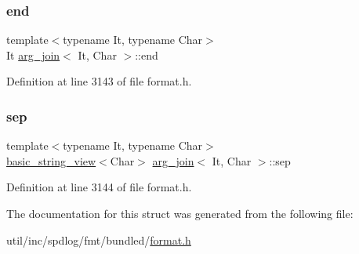 \subsubsection{\texorpdfstring{end}{end}}
{\footnotesize\ttfamily template$<$typename It, typename Char$>$ \\
It \hyperlink{structarg__join}{arg\+\_\+join}$<$ It, Char $>$\+::end}



Definition at line 3143 of file format.\+h.

\mbox{\label{structarg__join_a67aae7f3c5d2573a5fb85de3c5fd9b3d}} 
\subsubsection{\texorpdfstring{sep}{sep}}
{\footnotesize\ttfamily template$<$typename It, typename Char$>$ \\
\hyperlink{classbasic__string__view}{basic\+\_\+string\+\_\+view}$<$Char$>$ \hyperlink{structarg__join}{arg\+\_\+join}$<$ It, Char $>$\+::sep}



Definition at line 3144 of file format.\+h.



The documentation for this struct was generated from the following file\+:\begin{DoxyCompactItemize}
\item 
util/inc/spdlog/fmt/bundled/\hyperlink{format_8h}{format.\+h}\end{DoxyCompactItemize}
